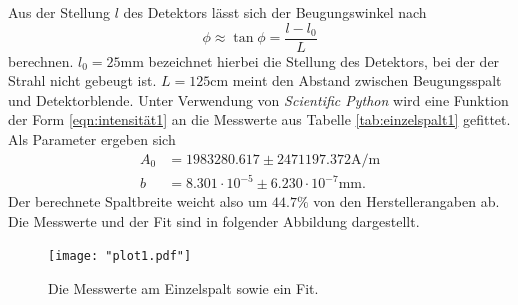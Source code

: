 \noindent
Aus der Stellung $l$ des Detektors lässt sich der Beugungswinkel nach
\begin{equation}
  \label{eqn:phiausw}
    \phi \approx \tan{\phi} = \frac{l-l_0}{L}
\end{equation}
berechnen. $l_0 = 25 \si{\milli\meter}$ bezeichnet hierbei die Stellung des Detektors, bei der der Strahl
nicht gebeugt ist. $L = 125 \si{\centi\meter}$ meint den Abstand zwischen Beugungsspalt und Detektorblende.
Unter Verwendung von \textit{Scientific Python} wird eine Funktion der Form \eqref{eqn:intensität1}
an die Messwerte aus Tabelle \ref{tab:einzelspalt1} gefittet. Als Parameter ergeben sich
\begin{align*}
  A_0 & = 1983280.617 \pm 2471197.372 \si{\ampere\per\meter}\\
  b   & = 8.301 \cdot 10^{-5} \pm 6.230 \cdot 10^{-7} \si{\milli\meter}.
\end{align*}
Der berechnete Spaltbreite weicht also um $44.7 \si{\percent}$ von den Herstellerangaben ab.
Die Messwerte und der Fit sind in folgender Abbildung dargestellt.
\begin{figure}[H]
  \centering
  \texttt{[image: "plot1.pdf"]}
  \caption{Die Messwerte am Einzelspalt sowie ein Fit.}
  \label{fig:einzel}
\end{figure}
\noindent

